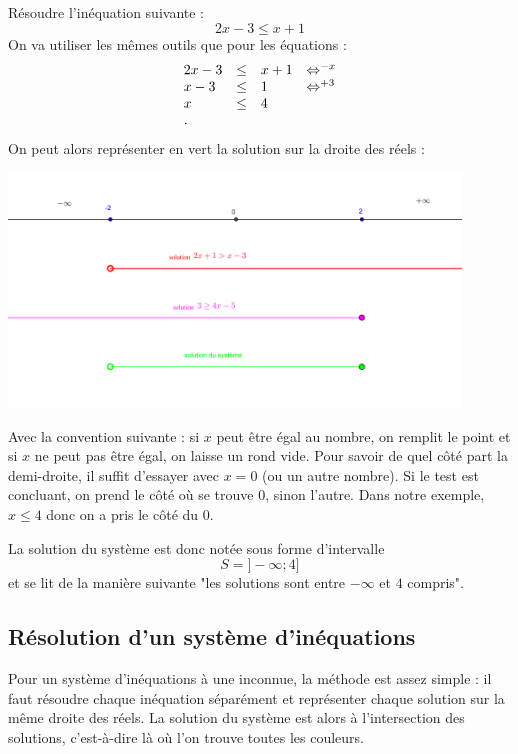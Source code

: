 \begin{exemple}
Résoudre l'inéquation suivante :
$$
2x-3 \leq x+1
$$
On va utiliser les mêmes outils que pour les équations :
$$
\begin{array}{lcll}
2x-3 &\leq& x+1 &\Leftrightarrow^{-x} \\
x-3 &\leq & 1 &\Leftrightarrow^{+3}\\
 x & \leq & 4&\\.
\end{array}
$$
On peut alors représenter en vert la solution sur la droite des réels :

\begin{center}
\includegraphics[width = 0.9\textwidth]{inequation1/innequation1.png}
\end{center}

Avec la convention suivante : si $x$ peut être égal au nombre, on remplit le point et si $x$ ne peut pas être égal, on laisse un rond vide. Pour savoir de quel côté part la demi-droite, il suffit d'essayer avec $x=0$ (ou un autre nombre). Si le test est concluant, on prend le côté où se trouve $0$, sinon l'autre. Dans notre exemple, $x\leq 4$ donc on a pris le côté du $0$.

La solution du système est donc notée sous forme d'intervalle~
$$
S = ]-\infty ; 4]
$$
et se lit de la manière suivante "les solutions sont entre $-\infty$ et $4$ compris".

\end{exemple}

\subsection{Résolution d'un système d'inéquations}

Pour un système d'inéquations à une inconnue, la méthode est assez simple : il faut résoudre chaque inéquation séparément et représenter chaque solution sur la même droite des réels. La solution du système est alors à l'intersection des solutions, c'est-à-dire là où l'on trouve toutes les couleurs.

